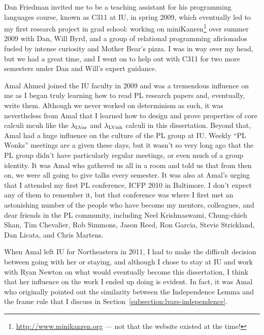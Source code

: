 
Dan Friedman invited me to be a teaching assistant for his programming languages course, known as C311 at IU, in spring 2009, which eventually led to my first research project in grad school: working on miniKanren\footnote{\url{http://www.minikanren.org} --- not that the website existed at the time!} over summer 2009 with Dan, Will Byrd, and a group of relational programming aficionados fueled by intense curiosity and Mother Bear's pizza.  I was in way over my head, but we had a great time, and I went on to help out with C311 for two more semesters under Dan and Will's expert guidance.

Amal Ahmed joined the IU faculty in 2009 and was a tremendous influence on me as I began truly learning how to read PL research papers and, eventually, write them.  Although we never worked on determinism as such, it was nevertheless from Amal that I learned how to design and prove properties of core calculi mcuh like the $\lambda_{\textrm{LVar}}$ and $\lambda_{\textrm{LVish}}$ calculi in this dissertation.  Beyond that, Amal had a huge influence on the culture of the PL group at IU.  Weekly ``PL Wonks'' meetings are a given these days, but it wasn't so very long ago that the PL group didn't have particularly regular meetings, or even much of a group identity.  It was Amal who gathered us all in a room and told us that from then on, we were all going to give talks every semester.  It was also at Amal's urging that I attended my first PL conference, ICFP 2010 in Baltimore.  I don't expect any of them to remember it, but that conference was where I first met an astonishing number of the people who have become my mentors, colleagues, and dear friends in the PL community, including Neel Krishnaswami, Chung-chieh Shan, Tim Chevalier, Rob Simmons, Jason Reed, Ron Garcia, Stevie Strickland, Dan Licata, and Chris Martens.

When Amal left IU for Northeastern in 2011, I had to make the difficult decision between going with her or staying, and although I chose to stay at IU and work with Ryan Newton on what would eventually become this dissertation, I think that her influence on the work I ended up doing is evident.  In fact, it was Amal who originally pointed out the similarity between the Independence Lemma and the frame rule that I discuss in Section~\ref{subsection:lvars-independence}.

